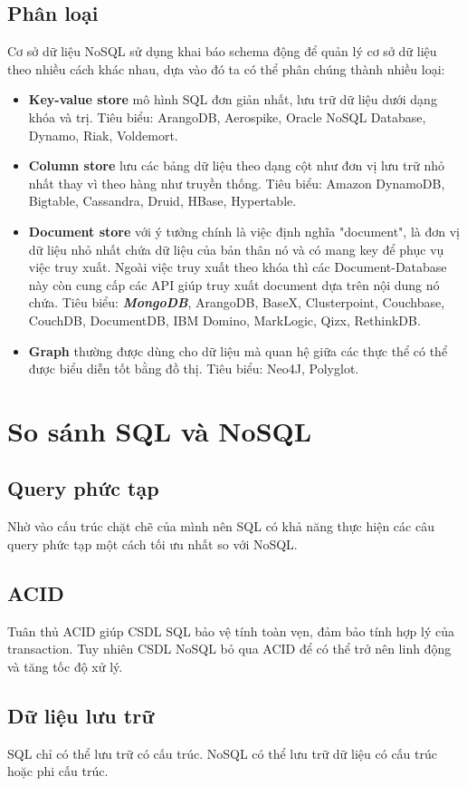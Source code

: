 \subsection{Phân loại}
Cơ sở dữ liệu NoSQL sử dụng khai báo schema động để quản lý cơ sở dữ liệu theo nhiều cách khác nhau, dựa vào đó ta có thể phân chúng thành nhiều loại:
\begin{itemize}
\item \textbf{Key-value store} mô hình SQL đơn giản nhất, lưu trữ dữ liệu dưới dạng khóa và trị. Tiêu biểu: ArangoDB, Aerospike, Oracle NoSQL Database, Dynamo, Riak, Voldemort.
\item \textbf{Column store} lưu các bảng dữ liệu theo dạng cột như đơn vị lưu trữ nhỏ nhất thay vì theo hàng như truyền thống. Tiêu biểu: Amazon DynamoDB, Bigtable, Cassandra, Druid, HBase, Hypertable.
\item \textbf{Document store} với ý tưởng chính là việc định nghĩa "document", là đơn vị dữ liệu nhỏ nhất chứa dữ liệu của bản thân nó và có mang key để phục vụ việc truy xuất. Ngoài việc truy xuất theo khóa thì các Document-Database này còn cung cấp các API giúp truy xuất document dựa trên nội dung nó chứa. Tiêu biểu: \textbf{\textit{MongoDB}}, ArangoDB, BaseX, Clusterpoint, Couchbase, CouchDB, DocumentDB, IBM Domino, MarkLogic, Qizx, RethinkDB.
\item \textbf{Graph} thường được dùng cho dữ liệu mà quan hệ giữa các thực thể có thể được biểu diễn tốt bằng đồ thị. Tiêu biểu: Neo4J, Polyglot.
\end{itemize}
\section{So sánh SQL và NoSQL}
\subsection{Query phức tạp}
Nhờ vào cấu trúc chặt chẽ của mình nên SQL có khả năng thực hiện các câu query phức tạp một cách tối ưu nhất so với NoSQL.
\subsection{ACID}
Tuân thủ ACID giúp CSDL SQL bảo vệ tính toàn vẹn, đảm bảo tính hợp lý của transaction. Tuy nhiên CSDL NoSQL bỏ qua ACID để có thể trở nên linh động và tăng tốc độ xử lý.
\subsection{Dữ liệu lưu trữ}
SQL chỉ có thể lưu trữ có cấu trúc. NoSQL có thể lưu trữ dữ liệu có cấu trúc hoặc phi cấu trúc.

